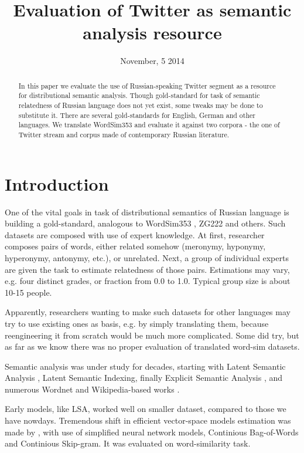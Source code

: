 \documentclass[11pt,letterpaper]{article}
\title{Evaluation of Twitter as semantic analysis resource}
\author{}
\date{November, 5 2014}
\begin{document}
\maketitle
\begin{abstract}
  In this paper we evaluate the use of Russian-speaking Twitter segment as a resource 
  for distributional semantic analysis. Though gold-standard for task of semantic relatedness
  of Russian language does not yet exist, some tweaks may be done to substitute it.  
  There are several gold-standards for English, German and other languages. 
  We translate WordSim353 and evaluate it against two corpora - the one of Twitter stream and 
  corpus made of contemporary Russian literature.
\end{abstract}

\section{Introduction}

One of the vital goals in task of distributional semantics of Russian language is building
a gold-standard, analogous to WordSim353 \cite{finkelstein2001placing}, ZG222 \cite{zesch2006auto} 
and others. 
Such datasets are composed with use of expert knowledge. At first, researcher composes pairs
of words, either related somehow (meronymy, hyponymy, hyperonymy, antonymy, etc.), or unrelated.
Next, a group of individual experts are given the task to estimate relatedness of those pairs.
Estimations may vary, e.g. four distinct grades, or fraction from 0.0 to 1.0. Typical group size is 
about 10-15 people.

Apparently, researchers wanting to make such datasets for other languages may try to use existing
ones as basis, e.g. by simply translating them, because reengineering it from scratch would be much more
complicated. Some did try, but as far as we know there was no proper evaluation of translated word-sim
datasets.

Semantic analysis
was under study for decades, starting with Latent Semantic Analysis \cite{landauer1998introduction}, 
Latent Semantic Indexing, finally Explicit Semantic Analysis \cite{gabrilovich2007computing}, and numerous
Wordnet and Wikipedia-based works \cite{zesch2008extracting}.

Early models, like LSA, worked well on smaller dataset, compared to those we have nowdays. 
Tremendous shift in efficient vector-space models estimation was made 
by \cite{mikolov2013efficient}, with use of simplified neural network models, Continious Bag-of-Words
and Continious Skip-gram. It was evaluated on word-similarity task. 
\end{document}
